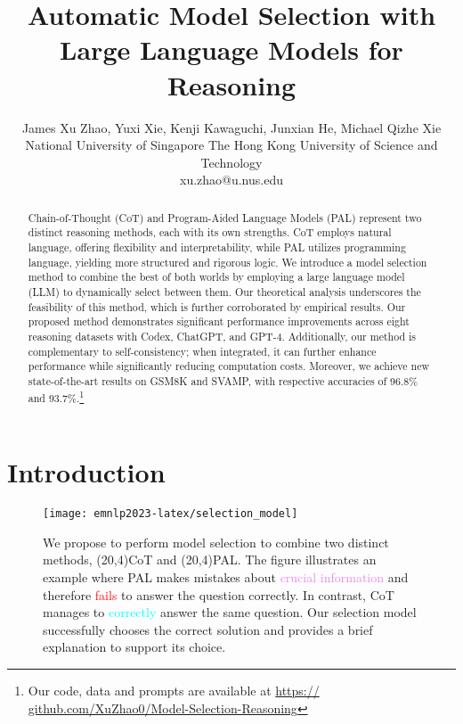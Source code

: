 \documentclass[11pt]{article}
\title{Automatic Model Selection with Large Language Models for Reasoning}
\author{James Xu Zhao, Yuxi Xie, Kenji Kawaguchi, Junxian He, Michael Qizhe Xie \\
   National University of Singapore \quad   The Hong Kong University of Science and Technology \\
  xu.zhao@u.nus.edu 
}
\begin{document}
\maketitle
\begin{abstract}

Chain-of-Thought (CoT) and Program-Aided Language Models (PAL) represent two distinct reasoning methods, each with its own strengths. CoT employs natural language, offering flexibility and interpretability, while PAL utilizes programming language, yielding more structured and rigorous logic. We introduce a model selection method to combine the best of both worlds by employing a large language model (LLM) to dynamically select between them. Our theoretical analysis underscores the feasibility of this method, which is further corroborated by empirical results. Our proposed method demonstrates significant performance improvements across eight reasoning datasets with Codex, ChatGPT, and GPT-4. Additionally, our method is complementary to self-consistency; when integrated, it can further enhance performance while significantly reducing computation costs. Moreover, we achieve new state-of-the-art results on GSM8K and SVAMP, with respective accuracies of 96.8\% and 93.7\%.\footnote{Our code, data and prompts are available at \href{https://github.com/XuZhao0/Model-Selection-Reasoning}{https://\\github.com/XuZhao0/Model-Selection-Reasoning}}

\end{abstract}

\section{Introduction}

\begin{figure*}[!h]
    \centering
    \texttt{[image: emnlp2023-latex/selection\_model]}
    \caption{We propose to perform model selection to combine two distinct methods, \colorbox[RGB]{227,240,237}{\makebox(20,4){CoT}} and \colorbox[RGB]{223,236,242}{\makebox(20,4){PAL}}. The figure illustrates an example where PAL makes mistakes about \textcolor{violet}{crucial information} and therefore \textcolor{red}{fails} to answer the question correctly. In contrast, CoT manages to \textcolor{cyan}{correctly} answer the same question. Our selection model successfully chooses the correct solution and provides a brief explanation to support its choice.}
    \label{fig:model_demo}
\end{figure*}
\end{document}
